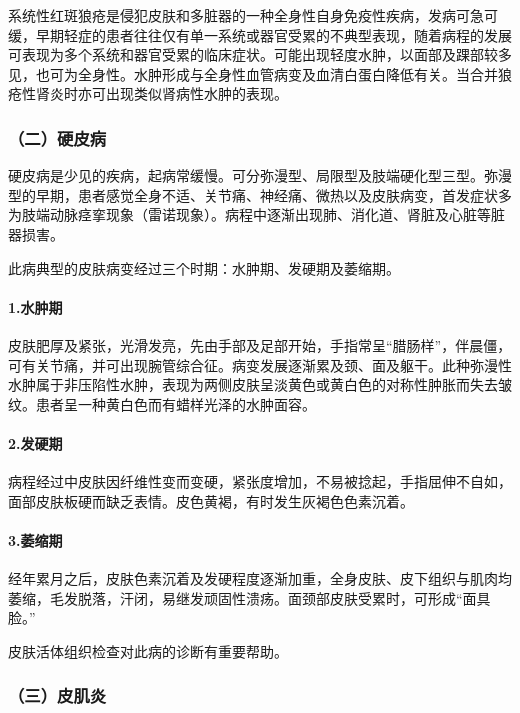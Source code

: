 系统性红斑狼疮是侵犯皮肤和多脏器的一种全身性自身免疫性疾病，发病可急可缓，早期轻症的患者往往仅有单一系统或器官受累的不典型表现，随着病程的发展可表现为多个系统和器官受累的临床症状。可能出现轻度水肿，以面部及踝部较多见，也可为全身性。水肿形成与全身性血管病变及血清白蛋白降低有关。当合并狼疮性肾炎时亦可出现类似肾病性水肿的表现。

\subsubsection{（二）硬皮病}

硬皮病是少见的疾病，起病常缓慢。可分弥漫型、局限型及肢端硬化型三型。弥漫型的早期，患者感觉全身不适、关节痛、神经痛、微热以及皮肤病变，首发症状多为肢端动脉痉挛现象（雷诺现象）。病程中逐渐出现肺、消化道、肾脏及心脏等脏器损害。

此病典型的皮肤病变经过三个时期：水肿期、发硬期及萎缩期。

\paragraph{1.水肿期}

皮肤肥厚及紧张，光滑发亮，先由手部及足部开始，手指常呈“腊肠样”，伴晨僵，可有关节痛，并可出现腕管综合征。病变发展逐渐累及颈、面及躯干。此种弥漫性水肿属于非压陷性水肿，表现为两侧皮肤呈淡黄色或黄白色的对称性肿胀而失去皱纹。患者呈一种黄白色而有蜡样光泽的水肿面容。

\paragraph{2.发硬期}

病程经过中皮肤因纤维性变而变硬，紧张度增加，不易被捻起，手指屈伸不自如，面部皮肤板硬而缺乏表情。皮色黄褐，有时发生灰褐色色素沉着。

\paragraph{3.萎缩期}

经年累月之后，皮肤色素沉着及发硬程度逐渐加重，全身皮肤、皮下组织与肌肉均萎缩，毛发脱落，汗闭，易继发顽固性溃疡。面颈部皮肤受累时，可形成“面具脸。”

皮肤活体组织检查对此病的诊断有重要帮助。

\subsubsection{（三）皮肌炎}

